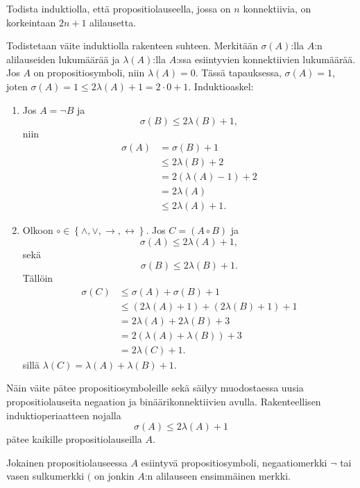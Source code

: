 \documentclass[11pt,a4paper]{amsart}
\begin{document}
\begin{exercise}
Todista induktiolla, että propositiolauseella, jossa on \(n\) konnektiivia,
on korkeintaan \(2n + 1\) alilausetta.
\end{exercise}

\begin{solution}
Todistetaan väite induktiolla rakenteen suhteen. Merkitään \(\sigma(A)\):lla
\(A\):n alilauseiden lukumäärää ja \(\lambda(A)\):lla \(A\):ssa esiintyvien
konnektiivien lukumäärää. Jos \(A\) on propositiosymboli, niin
\(\lambda(A) = 0\). Tässä tapauksessa, \(\sigma(A) = 1\), joten
\(\sigma(A) = 1 \leq 2\lambda(A) + 1 = 2\cdot 0 + 1\). Induktioaskel:
\begin{enumerate}[label=\alph*), nosep]
\item Jos \(A = \neg B\) ja
\[\sigma(B) \leq 2\lambda(B) + 1,\]
niin
\[
\begin{aligned}
\sigma(A) &= \sigma(B) + 1 \\
&\leq 2\lambda(B) + 2 \\
&= 2(\lambda(A) - 1) + 2 \\
&= 2\lambda(A) \\
&\leq 2\lambda(A) + 1.
\end{aligned}
\]
\item Olkoon \(\circ \in \left\{\land, \lor, \rightarrow,
\leftrightarrow \right\}\).
Jos \(C = (A \circ B)\) ja
\[\sigma(A) \leq 2\lambda(A) + 1,\]
sekä
\[\sigma(B) \leq 2\lambda(B) + 1.\]
Tällöin
\[
\begin{aligned}
\sigma(C) &\leq \sigma(A) + \sigma(B) + 1 \\
&\leq (2\lambda(A) + 1) + (2\lambda(B) + 1) + 1 \\
&= 2\lambda(A) + 2\lambda(B) + 3 \\
&= 2(\lambda(A) + \lambda(B)) + 3 \\
&= 2\lambda(C) + 1.
\end{aligned}
\]
sillä \(\lambda(C) = \lambda(A) + \lambda(B) + 1\).
\end{enumerate}
Näin väite pätee propositiosymboleille sekä säilyy muodostaessa
uusia propositiolauseita negaation ja binäärikonnektiivien avulla.
Rakenteellisen induktioperiaatteen nojalla
\[\sigma(A) \leq 2\lambda(A) + 1\]
pätee kaikille propositiolauseilla \(A\).
\end{solution}

\begin{lemma}\label{lem:subformula}
Jokainen propositiolauseessa \(A\) esiintyvä propositiosymboli,
negaatiomerkki \(\neg\) tai vasen sulkumerkki \((\) on jonkin
\(A\):n alilauseen ensimmäinen merkki.
\end{lemma}
\end{document}
